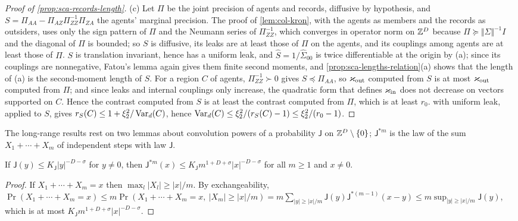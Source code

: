 \begin{proof}[Proof of \cref{prop:sca-records-length}]
(c) Let $\Pi$ be the joint precision of agents and records, diffusive by hypothesis, and $S=\Pi_{AA}-\Pi_{AZ}\Pi_{ZZ}^{-1}\Pi_{ZA}$ the agents' marginal precision. The proof of \cref{lem:col-kron}, with the agents as members and the records as outsiders, uses only the sign pattern of $\Pi$ and the Neumann series of $\Pi_{ZZ}^{-1}$, which converges in operator norm on $\mathbb{Z}^D$ because $\Pi\succeq\Vert\Sigma\Vert^{-1}I$ and the diagonal of $\Pi$ is bounded; so $S$ is diffusive, its leaks are at least those of $\Pi$ on the agents, and its couplings among agents are at least those of $\Pi$. $S$ is translation invariant, hence has a uniform leak, and $\hat S=1/\hat\Sigma_{00}$ is twice differentiable at the origin by (a); since its couplings are nonnegative, Fatou's lemma again gives them finite second moments, and \cref{prop:sca-lengths-relation}(a) shows that the length of (a) is the second-moment length of $S$. For a region $C$ of agents, $\Pi_{ZZ}^{-1}\succ0$ gives $S\preceq\Pi_{AA}$, so $\varkappa_{\mathrm{out}}$ computed from $S$ is at most $\varkappa_{\mathrm{out}}$ computed from $\Pi$; and since leaks and internal couplings only increase, the quadratic form that defines $\varkappa_{\mathrm{in}}$ does not decrease on vectors supported on $C$. Hence the contrast computed from $S$ is at least the contrast computed from $\Pi$, which is at least $r_0$.  with uniform leak, applied to $S$, gives $r_S(C)\le1+\xi_2^2/\operatorname{Var}_d(C)$, hence $\operatorname{Var}_d(C)\le\xi_2^2/(r_S(C)-1)\le\xi_2^2/(r_0-1)$.
\end{proof}

The long-range results rest on two lemmas about convolution powers of a probability $\mathsf J$ on $\mathbb{Z}^D\setminus\{0\}$; $\mathsf J^{\ast m}$ is the law of the sum $X_1+\cdots+X_m$ of independent steps with law $\mathsf J$.

\begin{lemma}\label{lem:sca-union}
If $\mathsf J(y)\le K_{\mathsf J}|y|^{-D-\sigma}$ for $y\neq0$, then $\mathsf J^{\ast m}(x)\le K_{\mathsf J}m^{1+D+\sigma}|x|^{-D-\sigma}$ for all $m\ge1$ and $x\neq0$.
\end{lemma}
\begin{proof}
If $X_1+\cdots+X_m=x$ then $\max_l|X_l|\ge|x|/m$. By exchangeability, $\Pr(X_1+\cdots+X_m=x)\le m\Pr(X_1+\cdots+X_m=x,\ |X_m|\ge|x|/m)=m\sum_{|y|\ge|x|/m}\mathsf J(y)\mathsf J^{\ast(m-1)}(x-y)\le m\sup_{|y|\ge|x|/m}\mathsf J(y)$, which is at most $K_{\mathsf J}m^{1+D+\sigma}|x|^{-D-\sigma}$.
\end{proof}


